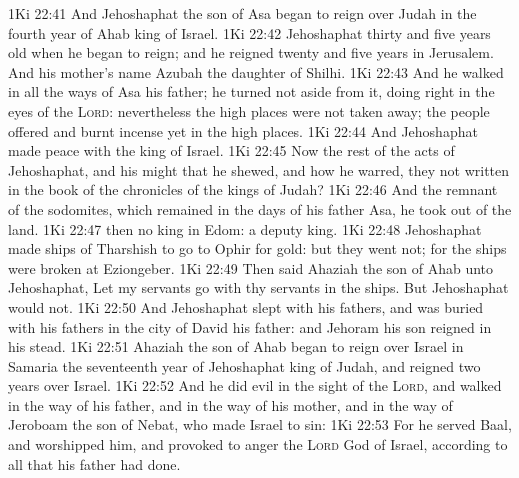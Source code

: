 \vs 1Ki 22:41 And Jehoshaphat the son of Asa began to reign over Judah in the fourth year of Ahab king of Israel.
\vs 1Ki 22:42 Jehoshaphat  thirty and five years old when he began to reign; and he reigned twenty and five years in Jerusalem. And his mother's name  Azubah the daughter of Shilhi.
\vs 1Ki 22:43 And he walked in all the ways of Asa his father; he turned not aside from it, doing  right in the eyes of the \textsc{Lord}: nevertheless the high places were not taken away;  the people offered and burnt incense yet in the high places.
\vs 1Ki 22:44 And Jehoshaphat made peace with the king of Israel.
\vs 1Ki 22:45 Now the rest of the acts of Jehoshaphat, and his might that he shewed, and how he warred,  they not written in the book of the chronicles of the kings of Judah?
\vs 1Ki 22:46 And the remnant of the sodomites, which remained in the days of his father Asa, he took out of the land.
\vs 1Ki 22:47  then no king in Edom: a deputy  king.
\vs 1Ki 22:48 Jehoshaphat made ships of Tharshish to go to Ophir for gold: but they went not; for the ships were broken at Eziongeber.
\vs 1Ki 22:49 Then said Ahaziah the son of Ahab unto Jehoshaphat, Let my servants go with thy servants in the ships. But Jehoshaphat would not.
\vs 1Ki 22:50 And Jehoshaphat slept with his fathers, and was buried with his fathers in the city of David his father: and Jehoram his son reigned in his stead.
\vs 1Ki 22:51 Ahaziah the son of Ahab began to reign over Israel in Samaria the seventeenth year of Jehoshaphat king of Judah, and reigned two years over Israel.
\vs 1Ki 22:52 And he did evil in the sight of the \textsc{Lord}, and walked in the way of his father, and in the way of his mother, and in the way of Jeroboam the son of Nebat, who made Israel to sin:
\vs 1Ki 22:53 For he served Baal, and worshipped him, and provoked to anger the \textsc{Lord} God of Israel, according to all that his father had done.

